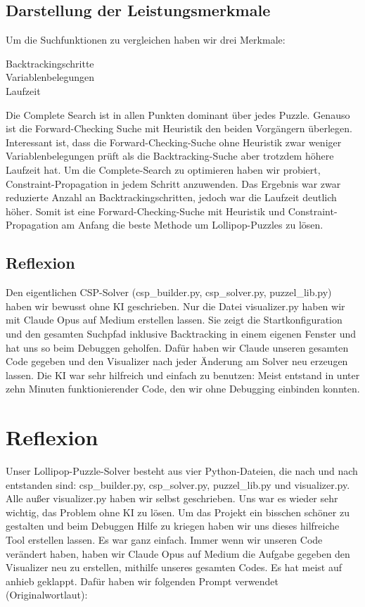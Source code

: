 \documentclass{article}
\begin{document}
\subsection{Darstellung der Leistungsmerkmale}
Um die Suchfunktionen zu vergleichen haben wir drei Merkmale:
\begin{description}
    \item[Backtrackingschritte]
    \item[Variablenbelegungen]
    \item[Laufzeit]
\end{description}
Die Complete Search ist in allen Punkten dominant über jedes Puzzle.
Genauso ist die Forward-Checking Suche mit Heuristik den beiden Vorgängern überlegen.
Interessant ist, dass die Forward-Checking-Suche ohne Heuristik zwar weniger Variablenbelegungen prüft als die Backtracking-Suche aber trotzdem höhere Laufzeit hat.
Um die Complete-Search zu optimieren haben wir probiert, Constraint-Propagation in jedem Schritt anzuwenden.
Das Ergebnis war zwar reduzierte Anzahl an Backtrackingschritten, jedoch war die Laufzeit deutlich höher.
Somit ist eine Forward-Checking-Suche mit Heuristik und Constraint-Propagation am Anfang die beste Methode um Lollipop-Puzzles zu lösen.

\subsection{Reflexion}

Den eigentlichen CSP-Solver (csp\_builder.py, csp\_solver.py, puzzel\_lib.py) haben wir bewusst 
ohne KI geschrieben. Nur die Datei visualizer.py haben wir mit Claude Opus auf Medium
erstellen lassen. Sie zeigt die Startkonfiguration und den gesamten Suchpfad inklusive Backtracking 
in einem eigenen Fenster und hat uns so beim Debuggen geholfen. Dafür haben wir Claude unseren 
gesamten Code gegeben und den Visualizer nach jeder Änderung am Solver neu erzeugen lassen. Die KI 
war sehr hilfreich und einfach zu benutzen: Meist entstand in unter zehn Minuten funktionierender Code, 
den wir ohne Debugging einbinden konnten.

\newpage
\section{Reflexion}

Unser Lollipop-Puzzle-Solver besteht aus vier Python-Dateien, die nach und nach entstanden sind: csp\_builder.py, csp\_solver.py, puzzel\_lib.py und visualizer.py. 
Alle außer visualizer.py haben wir selbst geschrieben.
Uns war es wieder sehr wichtig, das Problem ohne KI zu lösen. Um das Projekt ein bisschen schöner zu gestalten und beim Debuggen Hilfe zu kriegen haben wir uns 
dieses hilfreiche Tool erstellen lassen. Es war ganz einfach. Immer wenn wir unseren Code verändert haben, haben wir Claude Opus auf Medium die Aufgabe gegeben 
den Visualizer neu zu erstellen, 
mithilfe unseres gesamten Codes. Es hat meist auf anhieb geklappt. Dafür haben wir folgenden Prompt verwendet (Originalwortlaut):
\end{document}
